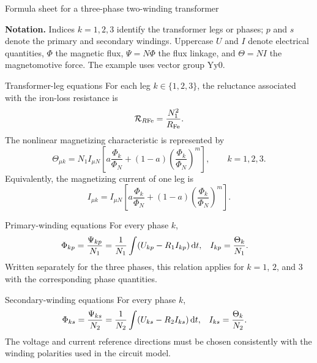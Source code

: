 %
  {Formula sheet for a three-phase two-winding transformer}
	\begin{noteBox}
		\textbf{Notation.} Indices $k=1,2,3$ identify the transformer legs or phases;
		$p$ and $s$ denote the primary and secondary windings. Uppercase $U$ and $I$
		denote electrical quantities, $\Phi$ the magnetic flux, $\Psi=N\Phi$ the flux
		linkage, and $\Theta=NI$ the magnetomotive force. The example uses vector group
		$\mathrm{Yy0}$.
	\end{noteBox}
	
	\begin{formulaBox}{Transformer-leg equations}
		For each leg $k\in\{1,2,3\}$, the reluctance associated with the iron-loss
		resistance is
		\begin{equation}
			\mathcal{R}_{R\mathrm{Fe}}=\frac{N_1^2}{R_{\mathrm{Fe}}}.
		\end{equation}
		The nonlinear magnetizing characteristic is represented by
		\begin{equation}
			\Theta_{\mu k}=N_1 I_{\mu N}
			\left[
			a\frac{\Phi_k}{\Phi_N}
			+(1-a)\left(\frac{\Phi_k}{\Phi_N}\right)^m
			\right],
			\qquad k=1,2,3.
		\end{equation}
		Equivalently, the magnetizing current of one leg is
		\begin{equation}
			I_{\mu k}=I_{\mu N}
			\left[
			a\frac{\Phi_k}{\Phi_N}
			+(1-a)\left(\frac{\Phi_k}{\Phi_N}\right)^m
			\right].
		\end{equation}
	\end{formulaBox}
	
	\begin{formulaBox}{Primary-winding equations}
		For every phase $k$,
		\begin{align}
			\Phi_{kp}
			&=\frac{\Psi_{kp}}{N_1}
			=\frac{1}{N_1}\int\!\left(U_{kp}-R_1I_{kp}\right)\mathop{}\!\mathrm{d} t,
			& I_{kp}&=\frac{\Theta_k}{N_1}.
		\end{align}
		Written separately for the three phases, this relation applies for
		$k=1$, $2$, and $3$ with the corresponding phase quantities.
	\end{formulaBox}
	
	\begin{formulaBox}{Secondary-winding equations}
		For every phase $k$,
		\begin{align}
			\Phi_{ks}
			&=\frac{\Psi_{ks}}{N_2}
			=\frac{1}{N_2}\int\!\left(U_{ks}-R_2I_{ks}\right)\mathop{}\!\mathrm{d} t,
			& I_{ks}&=\frac{\Theta_k}{N_2}.
		\end{align}
		The voltage and current reference directions must be chosen consistently with
		the winding polarities used in the circuit model.
	\end{formulaBox}
	
